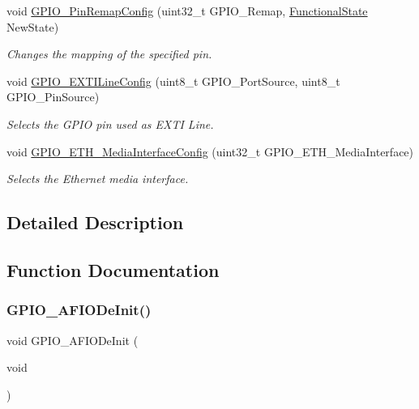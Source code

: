 \begin{DoxyCompactItemize}
void \hyperlink{group___g_p_i_o___exported___functions_ga64eb76f6211b840daf9829289df4208b}{G\+P\+I\+O\+\_\+\+Pin\+Remap\+Config} (uint32\+\_\+t G\+P\+I\+O\+\_\+\+Remap, \hyperlink{group___exported__types_gac9a7e9a35d2513ec15c3b537aaa4fba1}{Functional\+State} New\+State)
\begin{DoxyCompactList}\small\item\em Changes the mapping of the specified pin. \end{DoxyCompactList}\item 
void \hyperlink{group___g_p_i_o___exported___functions_ga8c1f13646d7418827378032a584da653}{G\+P\+I\+O\+\_\+\+E\+X\+T\+I\+Line\+Config} (uint8\+\_\+t G\+P\+I\+O\+\_\+\+Port\+Source, uint8\+\_\+t G\+P\+I\+O\+\_\+\+Pin\+Source)
\begin{DoxyCompactList}\small\item\em Selects the G\+P\+IO pin used as E\+X\+TI Line. \end{DoxyCompactList}\item 
void \hyperlink{group___g_p_i_o___exported___functions_gacbfad958f684347be0f2c762dc85c3c2}{G\+P\+I\+O\+\_\+\+E\+T\+H\+\_\+\+Media\+Interface\+Config} (uint32\+\_\+t G\+P\+I\+O\+\_\+\+E\+T\+H\+\_\+\+Media\+Interface)
\begin{DoxyCompactList}\small\item\em Selects the Ethernet media interface. \end{DoxyCompactList}\end{DoxyCompactItemize}


\subsection{Detailed Description}


\subsection{Function Documentation}
\mbox{\label{group___g_p_i_o___exported___functions_ga7f645e6b6146818c3d6c19021e70170c}} 
\subsubsection{\texorpdfstring{G\+P\+I\+O\+\_\+\+A\+F\+I\+O\+De\+Init()}{GPIO\_AFIODeInit()}}
{\footnotesize\ttfamily void G\+P\+I\+O\+\_\+\+A\+F\+I\+O\+De\+Init (\begin{DoxyParamCaption}\item[{void}]{ }\end{DoxyParamCaption})}



